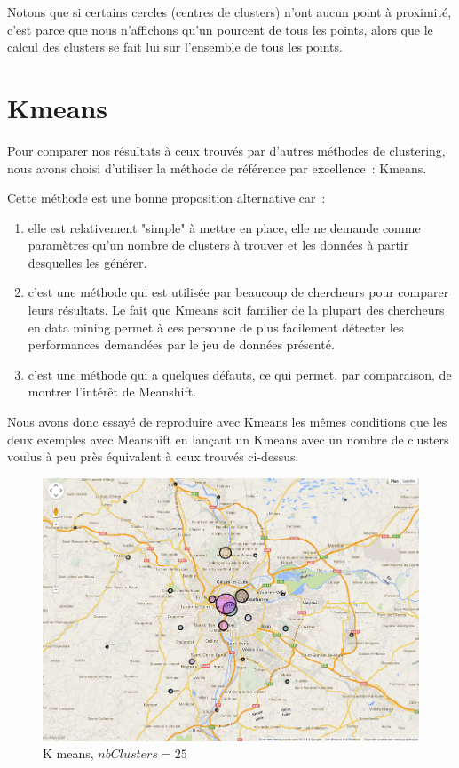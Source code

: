 Notons que si certains cercles (centres de clusters) n'ont aucun point à proximité, c'est parce que nous n'affichons qu'un pourcent de tous les points, alors que le calcul des clusters se fait lui sur l'ensemble de tous les points.

\newpage
\section{Kmeans}

Pour comparer nos résultats à ceux trouvés par d'autres méthodes de clustering, nous avons choisi d'utiliser la méthode de référence par excellence~: Kmeans.

Cette méthode est une bonne proposition alternative car~:
\begin{enumerate}

  \item elle est relativement "simple" à mettre en place, elle ne demande comme paramètres qu'un nombre de clusters à trouver et les données à partir desquelles les générer.
  \item c'est une méthode qui est utilisée par beaucoup de chercheurs pour comparer leurs résultats. Le fait que Kmeans soit familier de la plupart des chercheurs en data mining permet à ces personne de plus facilement détecter les performances demandées par le jeu de données présenté.
  \item c'est une méthode qui a quelques défauts, ce qui permet, par comparaison, de montrer l'intérêt de Meanshift.

\end{enumerate}
 
Nous avons donc essayé de reproduire avec Kmeans les mêmes conditions que les deux exemples avec Meanshift en lançant un Kmeans avec un nombre de clusters voulus à peu près équivalent à ceux trouvés ci-dessus.

\begin{figure}[!h]
    \centering
    \includegraphics[width=16cm]{images/Kmeans1.png}
    \caption{K means, $nbClusters = 25$}
    \label{fig:Kmeans1}
\end{figure}

